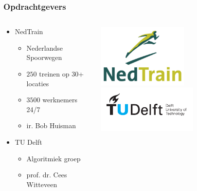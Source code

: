 \begin{frame}\frametitle{Opdrachtgevers}
\begin{columns}[T] %
    \begin{column}{.55\textwidth}
        \begin{itemize}
            \item NedTrain 
            \begin{itemize}
                \item Nederlandse Spoorwegen
                \item $250$ treinen op $30$+ locaties
                \item $3500$ werknemers 24/7 
                \item ir. Bob Huisman
            \end{itemize}
        \end{itemize}
        \vspace{1.8cm}
        \begin{itemize}
            \item TU Delft
            \begin{itemize}
                \item Algoritmiek groep
                \item prof. dr. Cees Witteveen
            \end{itemize}  
        \end{itemize}
    \end{column}%
    \begin{column}{.45\textwidth}
        \includegraphics[width=4.5cm]{images/logo-nedtrain.jpg}
        \vspace{1cm}
        \includegraphics[width=5cm]{images/tudelft_logo.pdf}
    \end{column}%
\end{columns}
\end{frame}

